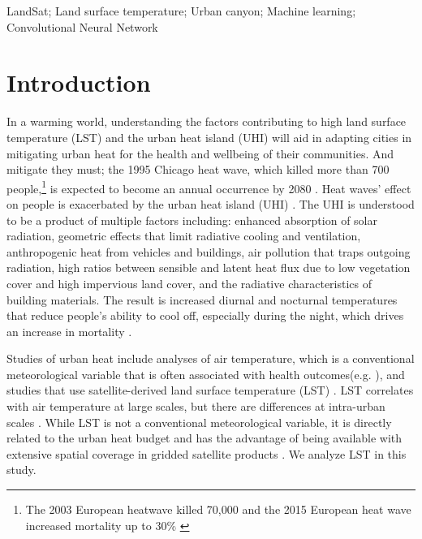 \documentclass[review]{elsarticle}
\begin{document}
\begin{frontmatter}
\begin{keyword}
LandSat; Land surface temperature; Urban canyon; Machine learning; Convolutional Neural Network
\end{keyword}

\end{frontmatter}

\linenumbers

\section{Introduction}
In a warming world, understanding the factors contributing to high land surface temperature (LST) and the urban heat island (UHI) will aid in adapting cities in mitigating urban heat for the health and wellbeing of their communities.
And mitigate they must; the 1995 Chicago heat wave, which killed more than 700 people,\footnote{The 2003 European heatwave killed 70,000 \cite{Robine2008-ky} and the 2015 European heat wave increased mortality up to 30\% \cite{Vicedo-Cabrera2016-si}} is expected to become an annual occurrence by 2080 \cite{klinenberg2015heat}. 
Heat waves' effect on people is exacerbated by the urban heat island (UHI) \cite{Wicki2017-fv, Echevarria_Icaza2016-fr}.
The UHI is understood to be a product of multiple factors including: enhanced absorption of solar radiation, geometric effects that limit radiative cooling and ventilation, anthropogenic heat from vehicles and buildings, air pollution that traps outgoing radiation, high ratios between sensible and latent heat flux due to low vegetation cover and high impervious land cover, and the radiative characteristics of building materials. %
The result is increased diurnal and nocturnal temperatures that reduce people's ability to cool off, especially during the night, which drives an increase in mortality \cite{Echevarria_Icaza2016-fr, Murage2017-wj}.

Studies of urban heat include analyses of air temperature, which is a conventional meteorological variable that is often associated with health outcomes(e.g. \cite{Scott2016-lc}), and studies that use satellite-derived land surface temperature (LST) \cite{Imhoff2010-lf, Peng2012-iy, Peng2018-cp, Zhou2014-wc, Voogt2003-mm}.
LST correlates with air temperature at large scales, but there are differences at intra-urban scales \cite{Good2016-yk}.
While LST is not a conventional meteorological variable, it is directly related to the urban heat budget and has the advantage of being available with extensive spatial coverage in gridded satellite products \cite{Hung2006-qy}.
We analyze LST in this study.
\end{document}
